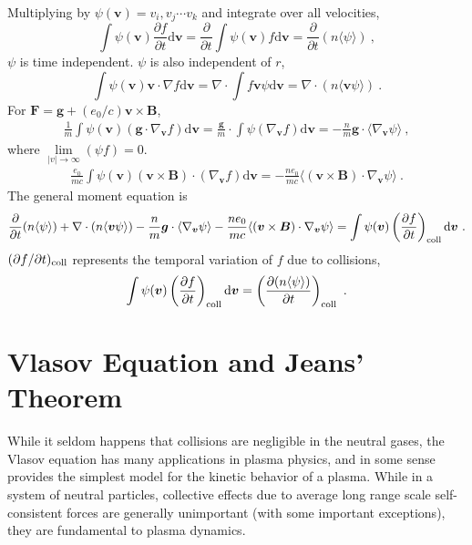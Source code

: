 \documentclass[12pt,a4paper]{article}
\renewcommand{\vec}[1]{\boldsymbol{#1}}
\newcommand{\dif}{\mathrm{d}}
\begin{document}
Multiplying by $\psi(\vec{v}) = v_i,v_j \cdots v_k$ and integrate over all velocities, 
\begin{equation*}
\int \psi(\vec{v}) \frac{\partial f}{\partial t} \dif \vec{v} = \frac{\partial }{\partial t} \int \psi(\vec{v}) f \dif \vec{v} = \frac{\partial }{\partial t} (n\langle \psi \rangle) ~,
\end{equation*}
$\psi$ is time independent. $\psi$ is also independent of $r$,
\begin{equation}
\int \psi(\vec{v}) \vec{v}\cdot \nabla f \dif \vec{v} = \nabla \cdot \int f \vec{v} \psi\dif \vec{v} = \nabla \cdot (n\langle \vec{v}\psi \rangle) ~.
\end{equation}
For $\vec{F} = \vec{g} + (e_0/c) \vec{v} \times \vec{B}$,
\begin{eqnarray*}
\frac{1}{m} \int \psi(\vec{v}) (\vec{g} \cdot \nabla_{\vec{v}} f) \dif \vec{v} = \frac{\vec{g}}{m} \cdot \int \psi (\nabla_{\vec{v}} f) \dif \vec{v} = -\frac{n}{m} \vec{g} \cdot \langle \nabla_{\vec{v}} \psi \rangle ~,
\end{eqnarray*}
where $\lim\limits_{|v|\rightarrow \infty} (\psi f) = 0$.
\begin{eqnarray*}
\frac{e_0}{mc} \int \psi(\vec{v}) (\vec{v} \times \vec{B}) \cdot (\nabla_{\vec{v}} f) \dif \vec{v} = -\frac{ne_0}{mc}  \langle  (\vec{v} \times \vec{B})\cdot \nabla_{\vec{v}} \psi \rangle ~.
\end{eqnarray*}
The general moment equation is 
\begin{eqnarray}
\frac{\partial }{\partial t} (n\langle \psi \rangle) +\nabla\cdot (n\langle \vec{v} \psi \rangle) -\frac{n}{m} \vec{g} \cdot \langle \nabla_{\vec{v}} \psi \rangle -\frac{ne_0}{mc}  \langle  (\vec{v} \times \vec{B})\cdot \nabla_{\vec{v}} \psi \rangle = \int \psi(\vec{v}) \left(\frac{\partial f}{\partial t} \right)_{\rm coll} \dif \vec{v} ~.
\end{eqnarray}
$(\partial f /\partial t )_{\rm coll}$ represents the temporal variation of $f$ due to collisions, 
\begin{equation*}
\int \psi(\vec{v}) \left(\frac{\partial f}{\partial t} \right)_{\rm coll} \dif \vec{v} = \left(\frac{\partial (n\langle \psi \rangle)}{\partial t} \right)_{\rm coll} ~.
\end{equation*}


\section{Vlasov Equation and Jeans' Theorem}
While it seldom happens that collisions are negligible in the neutral gases, the Vlasov equation has many applications in plasma physics, and in some sense provides the simplest model for the kinetic behavior of a plasma. While in a system of neutral particles, collective effects due to average long range scale self-consistent forces are generally unimportant (with some important exceptions), they are fundamental to plasma dynamics.
\end{document}

